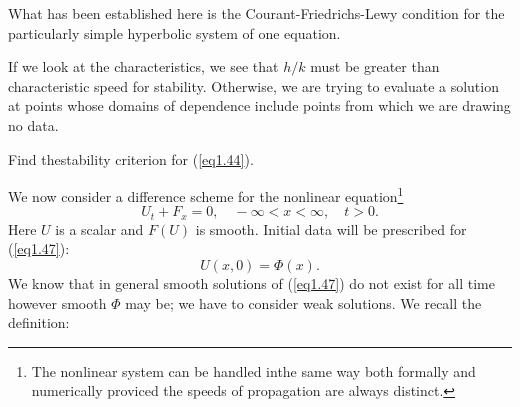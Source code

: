What has been established here is the Courant-Friedrichs-Lewy condition for the particularly simple hyperbolic system of one equation.

\begin{note*}
If we look at the characteristics, we see that $h/k$ must be greater than characteristic speed for stability. Otherwise, we are trying to evaluate a solution at points whose domains of dependence include points from which we are drawing no data. 
\end{note*}

\begin{exercise}\label{chap1:exer1.5}
Find the\pageoriginale stability criterion for (\ref{eq1.44}). 

We now consider a difference scheme for the nonlinear equation\footnote{The nonlinear system can be handled inthe same way both formally and numerically proviced the speeds of propagation are always distinct.}
\begin{equation*}
U_t + F_x = 0, \quad - \infty < x < \infty, \quad t>0. 
\tag{1.47}\label{eq1.47}
\end{equation*}
Here $U$ is a scalar and $F(U)$ is smooth. Initial data will be prescribed for (\ref{eq1.47}):
\begin{equation*}
U(x,0) = \Phi (x). \tag{1.48}\label{eq1.48}
\end{equation*}
We know that in general smooth solutions of (\ref{eq1.47}) do not exist for all time however smooth $\Phi$ may be; we have to consider weak solutions. We recall the definition:
\end{exercise}

